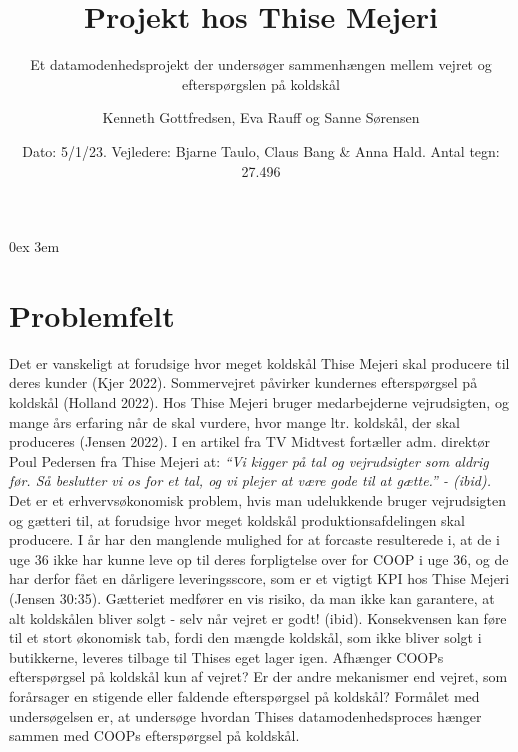 \documentclass[
  12pt,
  a4paper,
  DIV=11,
  numbers=noendperiod]{scrartcl}
\title{Projekt hos Thise Mejeri}
\subtitle{Et datamodenhedsprojekt der undersøger sammenhængen mellem
vejret og efterspørgslen på koldskål}
\author{Kenneth Gottfredsen, Eva Rauff og Sanne Sørensen}
\date{Dato: 5/1/23. Vejledere: Bjarne Taulo, Claus Bang \& Anna Hald.
Antal tegn: 27.496}
\renewcommand*\contentsname{Table of contents}
\newcommand\contentsname{Table of contents}
\begin{document}
\maketitle
\ifdefined\Shaded\renewenvironment{Shaded}{\begin{tcolorbox}[interior hidden, frame hidden, sharp corners, borderline west={3pt}{0pt}{shadecolor}, boxrule=0pt, breakable, enhanced]}{\end{tcolorbox}}\fi

\renewcommand*\contentsname{Indholdsfortegnelse}
{
\hypersetup{linkcolor=}
\setcounter{tocdepth}{3}
\tableofcontents
}
\setcounter{page}{1} 
\parindent 0ex
\emergencystretch 3em
\pagestyle{fancy}
\fancyhead{}
\fancyfoot{}
\fancyfoot[C]{\thepage}
\renewcommand{\headrulewidth}{0.5pt}
\renewcommand{\footrulewidth}{0.5pt}

\hypertarget{problemfelt}{%
\section{Problemfelt}\label{problemfelt}}

Det er vanskeligt at forudsige hvor meget koldskål Thise Mejeri skal
producere til deres kunder (Kjer 2022). Sommervejret påvirker kundernes
efterspørgsel på koldskål (Holland 2022). Hos Thise Mejeri bruger
medarbejderne vejrudsigten, og mange års erfaring når de skal vurdere,
hvor mange ltr. koldskål, der skal produceres (Jensen 2022). I en
artikel fra TV Midtvest fortæller adm. direktør Poul Pedersen fra Thise
Mejeri at: \emph{``Vi kigger på tal og vejrudsigter som aldrig før. Så
beslutter vi os for et tal, og vi plejer at være gode til at gætte.'' -
(ibid).} Det er et erhvervsøkonomisk problem, hvis man udelukkende
bruger vejrudsigten og gætteri til, at forudsige hvor meget koldskål
produktionsafdelingen skal producere. I år har den manglende mulighed
for at forcaste resulterede i, at de i uge 36 ikke har kunne leve op til
deres forpligtelse over for COOP i uge 36, og de har derfor fået en
dårligere leveringsscore, som er et vigtigt KPI hos Thise Mejeri (Jensen
30:35). Gætteriet medfører en vis risiko, da man ikke kan garantere, at
alt koldskålen bliver solgt - selv når vejret er godt! (ibid).
Konsekvensen kan føre til et stort økonomisk tab, fordi den mængde
koldskål, som ikke bliver solgt i butikkerne, leveres tilbage til Thises
eget lager igen. Afhænger COOPs efterspørgsel på koldskål kun af vejret?
Er der andre mekanismer end vejret, som forårsager en stigende eller
faldende efterspørgsel på koldskål? Formålet med undersøgelsen er, at
undersøge hvordan Thises datamodenhedsproces hænger sammen med COOPs
efterspørgsel på koldskål.
\end{document}
